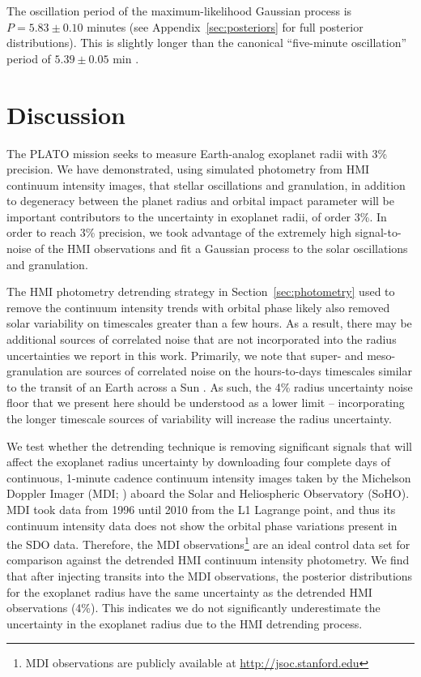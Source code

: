 The oscillation period of the maximum-likelihood Gaussian process is $P=5.83 \pm 0.10$ minutes (see Appendix~\ref{sec:posteriors} for full posterior distributions). This is slightly longer than the canonical ``five-minute oscillation'' period of $5.39 \pm 0.05$  min \citep{Fröhlich1997,Huber2011}.

\section{Discussion} \label{sec:discussion}

The PLATO mission seeks to measure Earth-analog exoplanet radii with 3\% precision. We have demonstrated, using simulated photometry from HMI continuum intensity images, that stellar oscillations and granulation, in addition to degeneracy between the planet radius and orbital impact parameter will be important contributors to the uncertainty in exoplanet radii, of order 3\%. In order to reach 3\% precision, we took advantage of the extremely high signal-to-noise of the HMI observations and fit a Gaussian process to the solar oscillations and granulation.

The HMI photometry detrending strategy in Section~\ref{sec:photometry} used to remove the continuum intensity trends with orbital phase likely also removed solar variability on timescales greater than a few hours. As a result, there may be additional sources of correlated noise that are not incorporated into the radius uncertainties we report in this work. Primarily, we note that super- and meso-granulation are sources of correlated noise on the hours-to-days timescales similar to the transit of an Earth across a Sun \citep{Fröhlich1997, Aigrain2004}. As such, the 4\% radius uncertainty noise floor that we present here should be understood as a lower limit -- incorporating the longer timescale sources of variability will increase the radius uncertainty. 

We test whether the detrending technique is removing significant signals that will affect the exoplanet radius uncertainty by downloading four complete days of continuous, 1-minute cadence continuum intensity images taken by the Michelson Doppler Imager (MDI; \citealt{scherrer95}) aboard the Solar and Heliospheric Observatory (SoHO). MDI took data from 1996 until 2010 from the L1 Lagrange point, and thus its continuum intensity data does not show the orbital phase variations present in the SDO data. Therefore, the MDI observations\footnote{MDI observations are publicly available at \url{http://jsoc.stanford.edu}} are an ideal control data set for comparison against the detrended HMI continuum intensity photometry. We find that after injecting transits into the MDI observations, the posterior distributions for the exoplanet radius have the same uncertainty as the detrended HMI observations (4\%). This indicates we do not significantly underestimate the uncertainty in the exoplanet radius due to the HMI detrending process.

